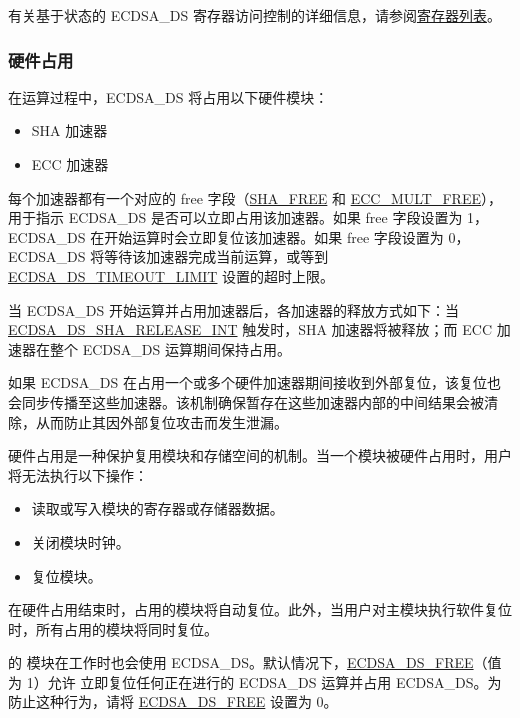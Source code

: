 \documentclass[main\_\_CN.tex]{subfiles}
\begin{document}
有关基于状态的 ECDSA\_DS 寄存器访问控制的详细信息，请参阅\hyperref[sec:ecdsa-reg-summ]{寄存器列表}。

\subsubsection{硬件占用}

在运算过程中，ECDSA\_DS 将占用以下硬件模块：

\begin{itemize}
    \item SHA 加速器
    \item ECC 加速器
\end{itemize}

每个加速器都有一个对应的 free 字段（\hyperref[fielddesc:SHAFREE]{SHA\_FREE} 和 \hyperref[fielddesc:ECCMULTFREE]{ECC\_MULT\_FREE}），用于指示 ECDSA\_DS 是否可以立即占用该加速器。如果 free 字段设置为 1，ECDSA\_DS 在开始运算时会立即复位该加速器。如果 free 字段设置为 0，ECDSA\_DS 将等待该加速器完成当前运算，或等到 \hyperref[fielddesc:ECDSADSTIMEOUTLIMIT]{ECDSA\_DS\_TIMEOUT\_LIMIT} 设置的超时上限。

当 ECDSA\_DS 开始运算并占用加速器后，各加速器的释放方式如下：当 \hyperref[int:ECDSADSSHARELEASEINT]{ECDSA\_DS\_SHA\_RELEASE\_INT} 触发时，SHA 加速器将被释放；而 ECC 加速器在整个 ECDSA\_DS 运算期间保持占用。

如果 ECDSA\_DS 在占用一个或多个硬件加速器期间接收到外部复位，该复位也会同步传播至这些加速器。该机制确保暂存在这些加速器内部的中间结果会被清除，从而防止其因外部复位攻击而发生泄漏。

\begin{tiplisting}
硬件占用是一种保护复用模块和存储空间的机制。当一个模块被硬件占用时，用户将无法执行以下操作：
\vspace{-0.5em}
\begin{itemize}
    \item 读取或写入模块的寄存器或存储器数据。
    \item 关闭模块时钟。
    \item 复位模块。
\end{itemize}
\vspace{-0.5em}
在硬件占用结束时，占用的模块将自动复位。此外，当用户对主模块执行软件复位时，所有占用的模块将同时复位。
\end{tiplisting}

\begin{importantlisting}
\vspace{-0.5em}
\chipname{} 的  模块在工作时也会使用 ECDSA\_DS。默认情况下，\hyperref[fielddesc:ECDSADSFREE]{ECDSA\_DS\_FREE}（值为 1）允许  立即复位任何正在进行的 ECDSA\_DS 运算并占用 ECDSA\_DS。为防止这种行为，请将 \hyperref[fielddesc:ECDSADSFREE]{ECDSA\_DS\_FREE} 设置为 0。
\end{importantlisting}
\end{document}
